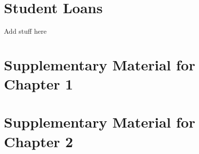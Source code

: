 \documentclass[12pt,letterpaper,oneside,final]{memoir}
\begin{document}
\chapter{Student Loans}

Add stuff here

\newpage
\clearpage

\begin{appendices}

\appendix
{}

\chapter{Supplementary Material for Chapter 1} \label{sec:Appendix1}

  
  

\chapter{Supplementary Material for Chapter 2} \label{sec:Appendix2}

  
  

\newpage
\clearpage

\end{appendices}

\newpage

\clearpage

\backmatter


  \begin{OnehalfSpace}
    
    
  \end{OnehalfSpace}
\end{document}

